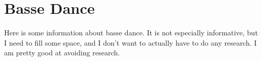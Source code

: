 \documentclass{book}
\begin{document}
\frontmatter


\chapter*{Basse Dance}

\thispagestyle{empty}
Here is some information about basse dance. It is not especially informative, but I need to fill some space, and I don't want to actually have to do any research. I am pretty good at avoiding research.
\end{document}
